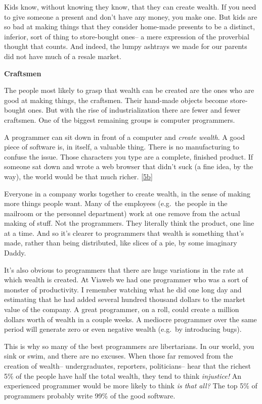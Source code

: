 Kids know, without knowing they know, that they can create wealth. If
you need to give someone a present and don't have any money, you make
one. But kids are so bad at making things that they consider home-made
presents to be a distinct, inferior, sort of thing to store-bought
ones-- a mere expression of the proverbial thought that counts. And
indeed, the lumpy ashtrays we made for our parents did not have much of
a resale market.

\textbf{Craftsmen}

The people most likely to grasp that wealth can be created are the ones
who are good at making things, the craftsmen. Their hand-made objects
become store-bought ones. But with the rise of industrialization there
are fewer and fewer craftsmen. One of the biggest remaining groups is
computer programmers.

A programmer can sit down in front of a computer and \emph{create
wealth}. A good piece of software is, in itself, a valuable thing. There
is no manufacturing to confuse the issue. Those characters you type are
a complete, finished product. If someone sat down and wrote a web
browser that didn't suck (a fine idea, by the way), the world would be
that much richer. {[}\hyperref[f5bn]{5b}{]}

Everyone in a company works together to create wealth, in the sense of
making more things people want. Many of the employees (e.g.~the people
in the mailroom or the personnel department) work at one remove from the
actual making of stuff. Not the programmers. They literally think the
product, one line at a time. And so it's clearer to programmers that
wealth is something that's made, rather than being distributed, like
slices of a pie, by some imaginary Daddy.

It's also obvious to programmers that there are huge variations in the
rate at which wealth is created. At Viaweb we had one programmer who was
a sort of monster of productivity. I remember watching what he did one
long day and estimating that he had added several hundred thousand
dollars to the market value of the company. A great programmer, on a
roll, could create a million dollars worth of wealth in a couple weeks.
A mediocre programmer over the same period will generate zero or even
negative wealth (e.g.~by introducing bugs).

This is why so many of the best programmers are libertarians. In our
world, you sink or swim, and there are no excuses. When those far
removed from the creation of wealth-- undergraduates, reporters,
politicians-- hear that the richest 5\% of the people have half the
total wealth, they tend to think \emph{injustice!} An experienced
programmer would be more likely to think \emph{is that all?} The top 5\%
of programmers probably write 99\% of the good software.

